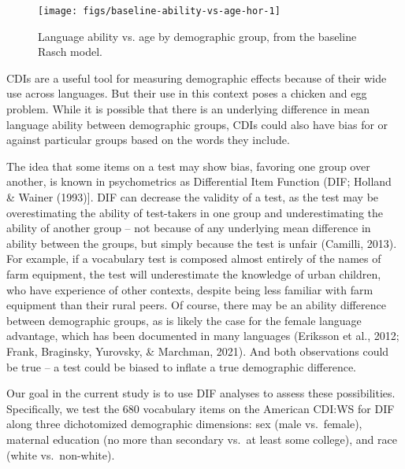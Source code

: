 \documentclass[10pt, letterpaper]{article}
\newenvironment{CodeChunk}{}{}
\begin{document}
\begin{CodeChunk}
\begin{figure}[t]

{\centering \texttt{[image: figs/baseline-ability-vs-age-hor-1]} 

}

\caption[Language ability vs]{Language ability vs. age by demographic group, from the baseline Rasch model.}\label{fig:baseline-ability-vs-age-hor}
\end{figure}
\end{CodeChunk}

CDIs are a useful tool for measuring demographic effects because of
their wide use across languages. But their use in this context poses a
chicken and egg problem. While it is possible that there is an
underlying difference in mean language ability between demographic
groups, CDIs could also have bias for or against particular groups based
on the words they include.

The idea that some items on a test may show bias, favoring one group
over another, is known in psychometrics as Differential Item Function
(DIF; Holland \& Wainer (1993){]}. DIF can decrease the validity of a
test, as the test may be overestimating the ability of test-takers in
one group and underestimating the ability of another group -- not
because of any underlying mean difference in ability between the groups,
but simply because the test is unfair (Camilli, 2013). For example, if a
vocabulary test is composed almost entirely of the names of farm
equipment, the test will underestimate the knowledge of urban children,
who have experience of other contexts, despite being less familiar with
farm equipment than their rural peers. Of course, there may be an
ability difference between demographic groups, as is likely the case for
the female language advantage, which has been documented in many
languages (Eriksson et al., 2012; Frank, Braginsky, Yurovsky, \&
Marchman, 2021). And both observations could be true -- a test could be
biased to inflate a true demographic difference.

Our goal in the current study is to use DIF analyses to assess these
possibilities. Specifically, we test the 680 vocabulary items on the
American CDI:WS for DIF along three dichotomized demographic dimensions:
sex (male vs.~female), maternal education (no more than secondary vs.~at
least some college), and race (white vs.~non-white).
\end{document}
